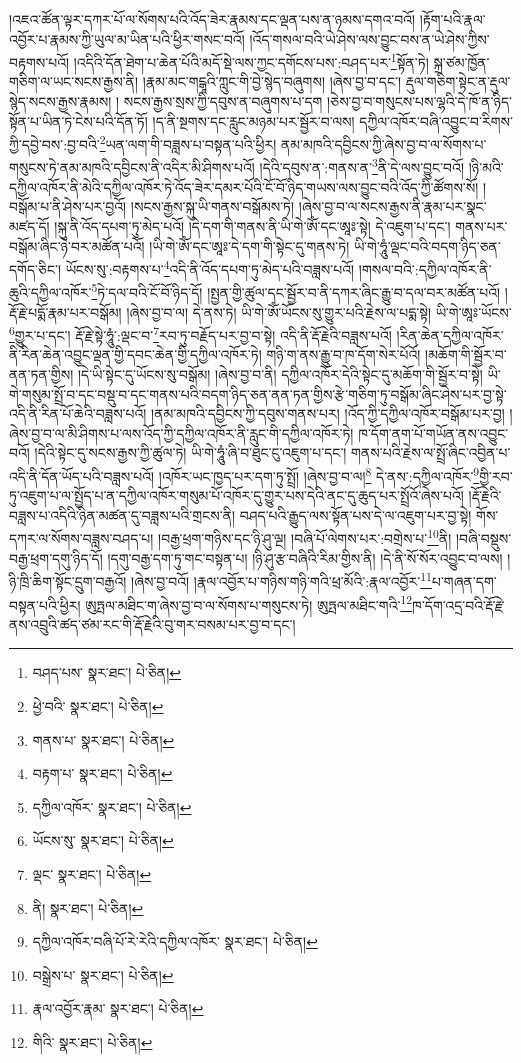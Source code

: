 །འཇའ་ཚོན་ལྟར་དཀར་པོ་ལ་སོགས་པའི་འོད་ཟེར་རྣམས་དང་ལྡན་པས་ན་ཉམས་དགའ་བའོ། །རྟོག་པའི་རྣལ་འབྱོར་པ་རྣམས་ཀྱི་ཡུལ་མ་ཡིན་པའི་ཕྱིར་གསང་བའོ། །འོད་གསལ་བའི་ཡེ་ཤེས་ལས་བྱུང་བས་ན་ཡེ་ཤེས་ཀྱིས་བརྟགས་པའོ། །འདིའི་དོན་ཐེག་པ་ཆེན་པོའི་མདོ་སྡེ་ལས་ཀྱང་དགོངས་པས་:བཤད་པར་\footnote{བཤད་པས་  སྣར་ཐང་།  པེ་ཅིན། }སྟོན་ཏེ། སྐྲ་ཙམ་ཁྱོན་གཅིག་ལ་ཡང་སངས་རྒྱས་ནི། །རྣམ་མང་གངྒཱའི་ཀླུང་གི་བྱེ་སྙེད་བཞུགས། །ཞེས་བྱ་བ་དང་། རྡུལ་གཅིག་སྟེང་ན་རྡུལ་སྙེད་སངས་རྒྱས་རྣམས། །
སངས་རྒྱས་སྲས་ཀྱི་དབུས་ན་བཞུགས་པ་དག །ཅེས་བྱ་བ་གསུངས་པས་ལྷའི་དེ་ཁོ་ན་ཉིད་སྟོན་པ་ཡིན་ཏེ་ངེས་པའི་དོན་ཏོ། །ད་ནི་སྔགས་དང་རླུང་མཉམ་པར་སྦྱོར་བ་ལས། དཀྱིལ་འཁོར་བཞི་འབྱུང་བ་རིགས་ཀྱི་དབྱེ་བས་:བྱ་བའི་\footnote{ཕྱེ་བའི་  སྣར་ཐང་།  པེ་ཅིན། }ཡན་ལག་གི་བཟླས་པ་བསྟན་པའི་ཕྱིར། ནམ་མཁའི་དབྱིངས་ཀྱི་ཞེས་བྱ་བ་ལ་སོགས་པ་གསུངས་ཏེ་ནམ་མཁའི་དབྱིངས་ནི་འདིར་མི་ཤིགས་པའོ། །དེའི་དབུས་ན་:གནས་ན་\footnote{གནས་པ་  སྣར་ཐང་།  པེ་ཅིན། }ནི་དེ་ལས་བྱུང་བའོ། །ཉི་མའི་དཀྱིལ་འཁོར་ནི་མེའི་དཀྱིལ་འཁོར་ཏེ་འོད་ཟེར་དམར་པོའི་ངོ་བོ་ཉིད་གཡས་ལས་བྱུང་བའི་འོད་ཀྱི་ཚོགས་སོ། །བསྒོམ་པ་ནི་ཤེས་པར་བྱའོ། །སངས་རྒྱས་སྐུ་ཡི་གནས་བསྒོམས་ཏེ། །ཞེས་བྱ་བ་ལ་སངས་རྒྱས་ནི་རྣམ་པར་སྣང་མཛད་དོ། །སྐུ་ནི་འོད་དཔག་ཏུ་མེད་པའོ། །དེ་དག་གི་གནས་ནི་ཡི་གེ་ཨོཾ་དང་ཨཱཿ་སྟེ། དེ་འཇུག་པ་དང་། གནས་པར་བསྒོམ་ཞིང་ཉེ་བར་མཚོན་པའོ། །ཡི་གེ་ཨོཾ་དང་ཨཱཿ་དེ་དག་གི་སྟེང་དུ་གནས་ཏེ། ཡི་གེ་ཧཱུཾ་ལྡང་བའི་བདག་ཉིད་ཅན་དགོད་ཅིང་། ཡོངས་སུ་:བརྟགས་པ་\footnote{བརྟག་པ་  སྣར་ཐང་།  པེ་ཅིན། }འདི་ནི་འོད་དཔག་ཏུ་མེད་པའི་བཟླས་པའོ། །གསལ་བའི་:དཀྱིལ་འཁོར་ནི་ཆུའི་དཀྱིལ་འཁོར་\footnote{དཀྱིལ་འཁོར་  སྣར་ཐང་།  པེ་ཅིན། }ཏེ་དལ་བའི་ངོ་བོ་ཉིད་དོ། །སྤྱན་གྱི་ཚུལ་དང་སྦྱོར་བ་ནི་དཀར་ཞིང་རྒྱུ་བ་དལ་བར་མཚོན་པའོ། །རྡོ་རྗེ་པདྨོ་རྣམ་པར་བསྒོམ། །ཞེས་བྱ་བ་ལ། དེ་ནས་ཏེ། ཡི་གེ་ཨོཾ་ཡོངས་སུ་གྱུར་པའི་རྗེས་ལ་པདྨ་སྟེ། ཡི་གེ་ཨཱཿ་ཡོངས་\footnote{ཡོངས་སུ་  སྣར་ཐང་།  པེ་ཅིན། }གྱུར་པ་དང་། རྡོ་རྗེ་སྟེ་ཧཱུཾ་:ལྡང་བ་\footnote{ལྡང་  སྣར་ཐང་།  པེ་ཅིན། }རབ་ཏུ་བརྗོད་པར་བྱ་བ་སྟེ། འདི་ནི་རྡོ་རྗེའི་བཟླས་པའོ། །རིན་ཆེན་དཀྱིལ་འཁོར་ནི་རིན་ཆེན་འབྱུང་ལྡན་གྱི་དབང་ཆེན་གྱི་དཀྱིལ་འཁོར་ཏེ། གཉི་ག་ནས་རྒྱུ་བ་ཁ་དོག་སེར་པོའོ། །མཆོག་གི་སྦྱོར་བ་ནན་ཏན་གྱིས། །དེ་ཡི་སྟེང་དུ་ཡོངས་སུ་བསྒོམ། །ཞེས་བྱ་བ་ནི། དཀྱིལ་འཁོར་དེའི་སྟེང་དུ་མཆོག་གི་སྦྱོར་བ་སྟེ། ཡི་གེ་གསུམ་སྤྲོ་བ་དང་བསྡུ་བ་དང་གནས་པའི་བདག་ཉིད་ཅན་ནན་ཏན་གྱིས་རྩེ་གཅིག་ཏུ་བསྒོམ་ཞིང་ཤེས་པར་བྱ་སྟེ་འདི་ནི་རིན་པོ་ཆེའི་བཟླས་པའོ། །ནམ་མཁའི་དབྱིངས་ཀྱི་དབུས་གནས་པར། །འོད་ཀྱི་དཀྱིལ་འཁོར་བསྒོམ་པར་བྱ། །ཞེས་བྱ་བ་ལ་མི་ཤིགས་པ་ལས་འོད་ཀྱི་དཀྱིལ་འཁོར་ནི་རླུང་གི་དཀྱིལ་འཁོར་ཏེ། ཁ་དོག་ནག་པོ་གཡོན་ནས་འབྱུང་བའོ། །དེའི་སྟེང་དུ་སངས་རྒྱས་ཀྱི་ཚུལ་ཏེ། ཡི་གེ་ཧཱུཾ་ཞི་བ་ཐུང་ངུ་འཇུག་པ་དང་། གནས་པའི་རྗེས་ལ་སྤྲོ་ཞིང་འབྱིན་པ་འདི་ནི་དོན་ཡོད་པའི་བཟླས་པའོ། །འཁོར་ཡང་ཁྱད་པར་དག་ཏུ་སྤྲོ། །ཞེས་བྱ་བ་ལ།\footnote{ནི།  སྣར་ཐང་།  པེ་ཅིན། } དེ་ནས་:དཀྱིལ་འཁོར་\footnote{དཀྱིལ་འཁོར་བཞི་པོ་རེ་རེའི་དཀྱིལ་འཁོར་  སྣར་ཐང་།  པེ་ཅིན། }གྱི་རབ་ཏུ་འཇུག་པ་ལ་སྤྱོད་པ་ན་དཀྱིལ་འཁོར་གསུམ་པོ་འཁོར་དུ་གྱུར་པས་དེའི་ནང་དུ་ཆུད་པར་སྤྲོའོ་ཞེས་པའོ། །རྡོ་རྗེའི་བཟླས་པ་འདིའི་ཉིན་མཚན་དུ་བཟླས་པའི་གྲངས་ནི། བཤད་པའི་རྒྱུད་ལས་སྟོན་པས་དེ་ལ་འཇུག་པར་བྱ་སྟེ། གོས་དཀར་ལ་སོགས་བཟླས་བཤད་པ། །བརྒྱ་ཕྲག་གཉིས་དང་ཉི་ཤུ་ལྔ། །བཞི་པོ་ལེགས་པར་:བགྲེས་པ་\footnote{བསྒྲེས་པ་  སྣར་ཐང་།  པེ་ཅིན། }ནི། །བཞི་བསྡུས་བརྒྱ་ཕྲག་དགུ་ཉིད་དོ། །དགུ་བརྒྱ་དག་ཏུ་གང་བསྟན་པ། །ཉི་ཤུ་རྩ་བཞིའི་རིམ་གྱིས་ནི། །དེ་ནི་སོ་སོར་འབྱུང་བ་ལས། །ཉི་ཁྲི་ཆིག་སྟོང་དྲུག་བརྒྱའོ། །ཞེས་བྱ་བའོ། །རྣལ་འབྱོར་པ་གཉིས་གཉི་གའི་ཕྲ་མོའི་:རྣལ་འབྱོར་\footnote{རྣལ་འབྱོར་རྣམ་  སྣར་ཐང་།  པེ་ཅིན། }པ་གཞན་དག་བསྟན་པའི་ཕྱིར། ཨུཏྤལ་མཐིང་ག་ཞེས་བྱ་བ་ལ་སོགས་པ་གསུངས་ཏེ། ཨུཏྤལ་མཐིང་གའི་\footnote{གིའི་  སྣར་ཐང་།  པེ་ཅིན། }ཁ་དོག་འདྲ་བའི་རྡོ་རྗེ་ནས་འབྲུའི་ཚད་ཙམ་རང་གི་རྡོ་རྗེའི་བུ་གར་བསམ་པར་བྱ་བ་དང་། 